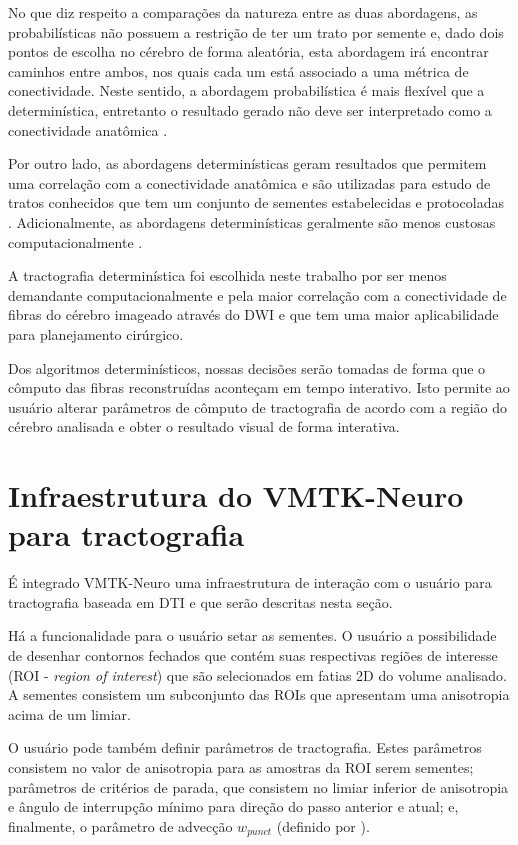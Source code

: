 \documentclass[
    12pt,                %
    oneside,            %
    a4paper,            %
    english,            %
    french,                %
    spanish,            %
    brazil                %
    ]{abntex2}
\begin{document}
No que diz respeito a comparações da natureza entre as duas abordagens, as probabilísticas não possuem a restrição de ter um trato por semente e, dado dois pontos de escolha no cérebro de forma aleatória, esta abordagem irá encontrar caminhos entre ambos, nos quais cada um está associado a uma métrica de conectividade. Neste sentido, a abordagem probabilística é mais flexível que a determinística, entretanto o resultado gerado não deve ser interpretado como a conectividade anatômica \cite{tournier2011}. 

Por outro lado, as abordagens determinísticas geram resultados que permitem uma correlação com a conectividade anatômica e são utilizadas para estudo de tratos conhecidos que tem um conjunto de sementes estabelecidas e protocoladas \cite{tournier2011}. Adicionalmente, as abordagens determinísticas geralmente são menos custosas computacionalmente \cite{DTI_Handbook}.

A tractografia determinística foi escolhida neste trabalho por ser menos demandante computacionalmente e pela maior correlação com a conectividade de fibras do cérebro imageado através do DWI e que tem uma maior aplicabilidade para planejamento cirúrgico.

Dos algoritmos determinísticos, nossas decisões serão tomadas de forma que o cômputo das fibras reconstruídas aconteçam em tempo interativo. Isto permite ao usuário alterar parâmetros de cômputo de tractografia de acordo com a região do cérebro analisada e obter o resultado visual de forma  interativa.

\section{Infraestrutura do VMTK-Neuro para tractografia}

É integrado VMTK-Neuro uma infraestrutura de interação com o usuário para tractografia baseada em DTI e que serão descritas nesta seção.

Há a funcionalidade para o usuário setar as sementes. O usuário a possibilidade de desenhar contornos fechados que contém suas respectivas regiões de interesse (ROI - \textit{region of interest}) que são selecionados em fatias 2D do volume analisado. A sementes consistem um subconjunto das ROIs que apresentam uma anisotropia acima de um limiar.

O usuário pode também definir parâmetros de tractografia. Estes parâmetros consistem no valor de anisotropia para as amostras da ROI serem sementes; parâmetros de critérios de parada, que consistem no limiar inferior de anisotropia e ângulo de interrupção mínimo para direção do passo anterior e atual; e, finalmente, o parâmetro de advecção $w_{punct}$ (definido por ).
\end{document}

